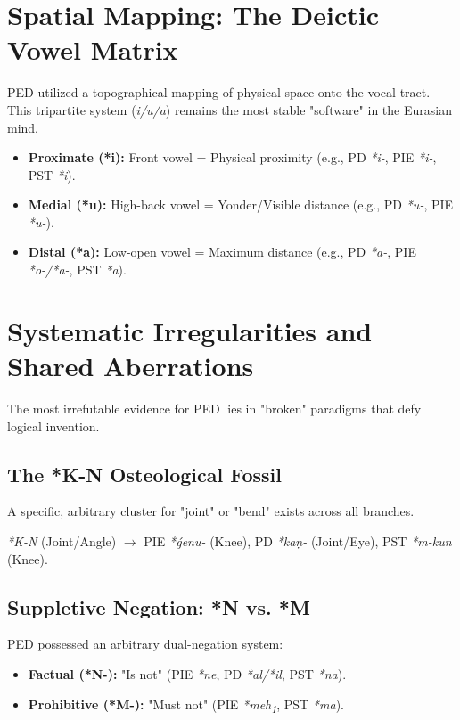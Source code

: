 \documentclass[11pt,a4paper]{article}
\begin{document}
\section{Spatial Mapping: The Deictic Vowel Matrix}
PED utilized a topographical mapping of physical space onto the vocal tract. This tripartite system (\textit{i/u/a}) remains the most stable "software" in the Eurasian mind.
\begin{itemize}
    \item \textbf{Proximate (*i):} Front vowel = Physical proximity (e.g., PD \textit{*i-}, PIE \textit{*i-}, PST \textit{*i}).
    \item \textbf{Medial (*u):} High-back vowel = Yonder/Visible distance (e.g., PD \textit{*u-}, PIE \textit{*u-}).
    \item \textbf{Distal (*a):} Low-open vowel = Maximum distance (e.g., PD \textit{*a-}, PIE \textit{*o-/*a-}, PST \textit{*a}).
\end{itemize}

\section{Systematic Irregularities and Shared Aberrations}
The most irrefutable evidence for PED lies in "broken" paradigms that defy logical invention.

\subsection{The *K-N Osteological Fossil}
A specific, arbitrary cluster for "joint" or "bend" exists across all branches.
\begin{center}
\textit{*K-N} (Joint/Angle) $\rightarrow$ PIE \textit{*ǵenu-} (Knee), PD \textit{*ka\d{n}-} (Joint/Eye), PST \textit{*m-kun} (Knee).
\end{center}

\subsection{Suppletive Negation: *N vs. *M}
PED possessed an arbitrary dual-negation system:
\begin{itemize}
    \item \textbf{Factual (*N-):} "Is not" (PIE \textit{*ne}, PD \textit{*al/*il}, PST \textit{*na}).
    \item \textbf{Prohibitive (*M-):} "Must not" (PIE \textit{*meh\textsubscript{1}}, PST \textit{*ma}).
\end{itemize}
\end{document}
